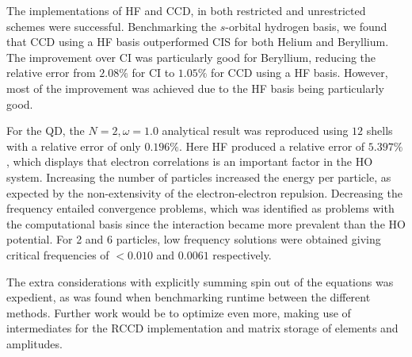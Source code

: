 The implementations of HF and CCD, in both restricted and unrestricted schemes were successful. Benchmarking the $s$-orbital hydrogen basis, we found that CCD using a HF basis outperformed CIS for both Helium and Beryllium. The improvement over CI was particularly good for Beryllium, reducing the relative error from $2.08\%$ for CI to $1.05\%$ for CCD using a HF basis. However, most of the improvement was achieved due to the HF basis being particularly good.

For the QD, the $N = 2, \omega = 1.0$ analytical result was reproduced using $12$ shells with a relative error of only $0.196\%$. Here HF produced a relative error of $5.397\%$, which displays that electron correlations is an important factor in the HO system. Increasing the number of particles increased the energy per particle, as expected by the non-extensivity of the electron-electron repulsion. Decreasing the frequency  entailed convergence problems, which was identified as problems with the computational basis since the interaction became more prevalent than the HO potential. For 2 and 6 particles, low frequency solutions were obtained giving critical frequencies of $<0.010$ and $0.0061$ respectively.

The extra considerations with explicitly summing spin out of the equations was expedient, as was found when benchmarking runtime between the different methods. Further work would be to optimize even more, making use of intermediates for the RCCD implementation and matrix storage of elements and amplitudes.